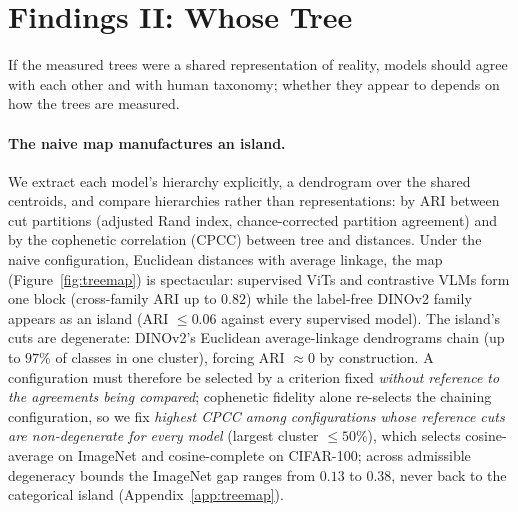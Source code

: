 \section{Findings II: Whose Tree}
\label{sec:content}

If the measured trees were a shared representation of reality, models should agree with each other and with human taxonomy; whether they appear to depends on how the trees are measured.

\paragraph{The naive map manufactures an island.} We extract each model's hierarchy explicitly, a dendrogram over the shared centroids, and compare hierarchies rather than representations: by ARI between cut partitions (adjusted Rand index, chance-corrected partition agreement) and by the cophenetic correlation (CPCC) between tree and distances. Under the naive configuration, Euclidean distances with average linkage, the map (Figure~\ref{fig:treemap}) is spectacular: supervised ViTs and contrastive VLMs form one block (cross-family ARI up to $0.82$) while the label-free DINOv2 family appears as an island (ARI $\le 0.06$ against every supervised model). The island's cuts are degenerate: DINOv2's Euclidean average-linkage dendrograms chain (up to $97\%$ of classes in one cluster), forcing ARI $\approx 0$ by construction. A configuration must therefore be selected by a criterion fixed \emph{without reference to the agreements being compared}; cophenetic fidelity alone re-selects the chaining configuration, so we fix \emph{highest CPCC among configurations whose reference cuts are non-degenerate for every model} (largest cluster $\le 50\%$), which selects cosine-average on ImageNet and cosine-complete on CIFAR-100; across admissible degeneracy bounds the ImageNet gap ranges from $0.13$ to $0.38$, never back to the categorical island (Appendix~\ref{app:treemap}). %


